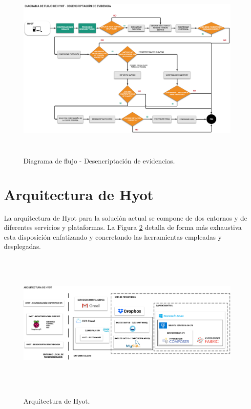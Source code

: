 \documentclass[12pt,a4paper, twoside]{report}
\begin{document}
  	\begin{figure}[!ht]   
		\caption{Diagrama de flujo - Desencriptación de evidencias.} 
		\begin{center} 
	 		\includegraphics[width=18cm,height=8.5cm]{Images/implement/hyot_decryptionflow} \\
			\label{fig:hyot_decryptionflow} 
		\end{center}  
	\end{figure}
		
	\section{Arquitectura de Hyot}
	
	La arquitectura de Hyot para la solución actual se compone de dos entornos y de diferentes servicios y plataformas. La Figura \ref{fig:hyot_architecture} detalla de forma más exhaustiva esta disposición enfatizando y concretando las herramientas empleadas y desplegadas.
	
		\begin{figure}[!ht]   
			\caption{Arquitectura de Hyot.} 
			\begin{center} 
	 			\includegraphics[width=18cm,height=7cm]{Images/implement/hyot_architecture} \\
				\label{fig:hyot_architecture} 
			\end{center}  
		\end{figure}
			
\end{document}
